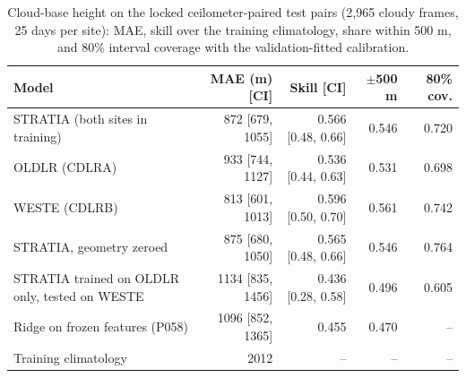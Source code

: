 \begin{table}[t]
\centering
\footnotesize
\begin{tabular}{lrrrr}
\toprule
Model & MAE (m) [CI] & Skill [CI] & $\pm$500 m & 80\% cov. \\
\midrule
STRATIA (both sites in training) & 872 [679, 1055] & 0.566 [0.48, 0.66] & 0.546 & 0.720 \\
  OLDLR (CDLRA) & 933 [744, 1127] & 0.536 [0.44, 0.63] & 0.531 & 0.698 \\
  WESTE (CDLRB) & 813 [601, 1013] & 0.596 [0.50, 0.70] & 0.561 & 0.742 \\
STRATIA, geometry zeroed & 875 [680, 1050] & 0.565 [0.48, 0.66] & 0.546 & 0.764 \\
STRATIA trained on OLDLR only, tested on WESTE & 1134 [835, 1456] & 0.436 [0.28, 0.58] & 0.496 & 0.605 \\
Ridge on frozen features (P058) & 1096 [852, 1365] & 0.455 & 0.470 & – \\
Training climatology & 2012 & – & – & – \\
\bottomrule
\end{tabular}
\caption{Cloud-base height on the locked ceilometer-paired test pairs (2,965 cloudy frames, 25 days per site): MAE, skill over the training climatology, share within 500 m, and 80\% interval coverage with the validation-fitted calibration.}
\label{tab:cbh}
\end{table}
